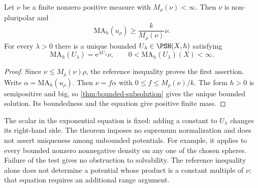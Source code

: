 \begin{theorem}\label{thm:fixed-spherical-exponential}
Let $\nu$ be a finite nonzero positive measure with $M_\rho(\nu)<\infty$. Then $\nu$ is non-pluripolar and
\[
 \mathrm{MA}_h(u_\rho)\geq\frac{k}{M_\rho(\nu)}\nu.
\]
For every $\lambda>0$ there is a unique bounded $U_\lambda\in\PSH(X,h)$ satisfying
\[
 \mathrm{MA}_h(U_\lambda)=\mathrm e^{\lambda U_\lambda}\nu,
 \qquad0<\mathrm{MA}_h(U_\lambda)(X)<\infty.
\]
\end{theorem}
\begin{proof}
Since $\nu\leq M_\rho(\nu)\rho$, the reference inequality proves the first assertion. Write $\alpha=\mathrm{MA}_h(u_\rho)$. Then $\nu=f\alpha$ with $0\leq f\leq M_\rho(\nu)/k$. The form $h>0$ is semipositive and big, so \cref{thm:bounded-subsolution} gives the unique bounded solution. Its boundedness and the equation give positive finite mass.
\end{proof}

The scalar in the exponential equation is fixed: adding a constant to $U_\lambda$ changes its right-hand side. The theorem imposes no supremum normalization and does not assert uniqueness among unbounded potentials. For example, it applies to every bounded nonzero nonnegative density on any one of the chosen spheres. Failure of the test gives no obstruction to solvability. The reference inequality alone does not determine a potential whose product is a constant multiple of $\nu$; that equation requires an additional range argument.
